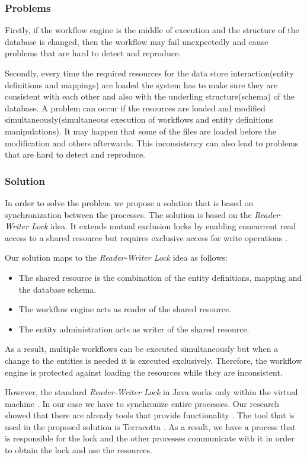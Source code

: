 \subsubsection{Problems}
Firstly, if the workflow engine is the middle of execution and the structure of the database is changed, then the workflow may fail unexpectedly and cause problems that are hard to detect and reproduce. 

Secondly, every time the required resources for the data store interaction(entity definitions and mappings) are loaded the system has to make sure they are consistent with each other and also with the underling structure(schema) of the database. A problem can occur if the resources are loaded and modified simultaneously(simultaneous execution of workflows and entity definitions manipulations). It may happen that some of the files are loaded before the modification and others afterwards. This inconsistency can also lead to problems that are hard to detect and reproduce.

\subsubsection{Solution}

In order to solve the problem we propose a solution that is based on synchronization between the processes. The solution is based on the \textit{Reader-Writer Lock} idea. It extends mutual exclusion locks by enabling concurrent read access to a shared resource but requires exclusive access for write operations \cite{Lev}.

Our solution maps to the \textit{Reader-Writer Lock} idea as follows:
\begin{itemize}
	\item The shared resource is the combination of the entity definitions, mapping and the database schema.
	\item The workflow engine acts as reader of the shared resource.
	\item The entity administration acts as writer of the shared resource.
\end{itemize}
As a result, multiple workflows can be executed simultaneously but when a change to the entities is needed it is executed exclusively. Therefore, the workflow engine is protected against loading the resources while they are inconsistent.

However, the standard \textit{Reader-Writer Lock} in Java works only within the virtual machine \cite{javadocs}. In our case we have to synchronize entire processes. Our research showed that there are already tools that provide functionality \cite{Hernane}. The tool that is used in the proposed solution is Terracotta \cite{terracotta}. As a result, we have a process that is responsible for the lock and the other processes communicate with it in order to obtain the lock and use the resources.


